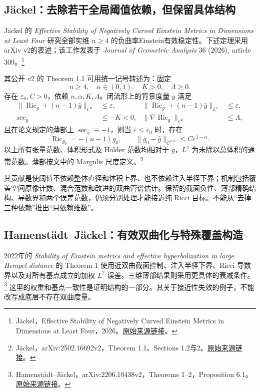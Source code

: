 \documentclass[11pt,a4paper]{article}
\theoremstyle{definition}
\newcommand{\Ric}{\operatorname{Ric}}
\newcommand{\src}[3]{\footnote{\raggedright #1，#2。\href{#3}{原始来源链接}。}}
\begin{document}
\subsection{Jäckel：去除若干全局阈值依赖，但保留具体结构}

Jäckel 的 \emph{Effective Stability of Negatively Curved Einstein Metrics in Dimensions at Least Four} 研究全部实维 $n\ge4$ 的负曲率Einstein有效稳定性。下述定理采用arXiv v2的表述；该工作发表于 \emph{Journal of Geometric Analysis} 36 (2026), article 309。\src{Jäckel}{Effective Stability of Negatively Curved Einstein Metrics in Dimensions at Least Four，2026}{https://link.springer.com/article/10.1007/s12220-026-02563-1}

其公开 v2 的 Theorem 1.1 可用统一记号转述为：固定
\[
n\ge4,\quad\alpha\in(0,1),\quad K>0,\quad\Lambda\ge0.
\]
存在 $\varepsilon_0,C>0$，依赖 $n,\alpha,K,\Lambda$。闭流形上的背景度量 $\bar g$ 满足
\begin{align*}
\|\Ric_{\bar g}+(n-1)\bar g\|_{C^0}&\le\varepsilon, &
\|\Ric_{\bar g}+(n-1)\bar g\|_{L^2}&\le\varepsilon,\\
\sec_{\bar g}&\le-K<0, &
\|\nabla\Ric_{\bar g}\|_{C^0}&\le\Lambda,
\end{align*}
且在论文规定的薄部上 $\sec_{\bar g}\equiv-1$，则当 $\varepsilon\le\varepsilon_0$ 时，存在
\[
\Ric_{g_0}=-(n-1)g_0,\qquad
\|g_0-\bar g\|_{C^{2,\alpha}}\le C\varepsilon^{1-\alpha}.
\]
以上所有张量范数、体积形式及 Hölder 范数均相对于 $\bar g$，$L^2$ 为未除以总体积的通常范数。薄部按文中的 Margulis 尺度定义。\src{Jäckel}{arXiv:2502.16692v2，Theorem 1.1、Sections 1.2与2}{https://arxiv.org/html/2502.16692v2}

其贡献是使阈值不依赖整体直径和体积上界、也不依赖注入半径下界；机制包括覆盖空间原像计数、混合范数和改进的双曲管谱估计。保留的截面负性、薄部精确结构、导数界和两个误差范数，仍须分别处理才能接近纯 Ricci 目标。不能从“去掉三种依赖”推出“只依赖维数”。

\subsection{Hamenstädt--Jäckel：有效双曲化与特殊覆盖构造}

2022年的 \emph{Stability of Einstein metrics and effective hyperbolization in large Hempel distance} 的 Theorem 1 使用近双曲截面控制、注入半径下界、Ricci 导数界以及对所有基点成立的加权 $L^2$ 误差。三维薄部结果则采用更具体的衰减条件。\src{Hamenstädt--Jäckel}{arXiv:2206.10438v2，Theorems 1--2，Proposition 6.1}{https://arxiv.org/abs/2206.10438v2}
这里的权重和基点一致性是证明结构的一部分。其关于接近性失效的例子，不能改写成底层不存在双曲度量。
\end{document}
